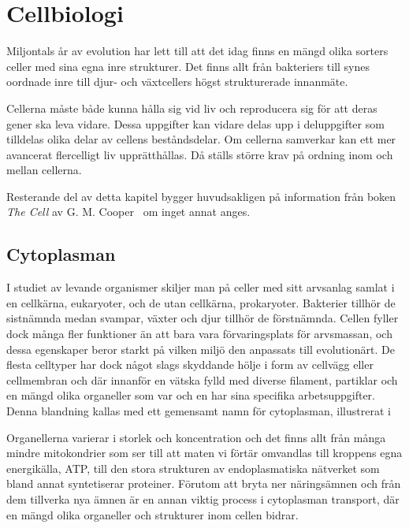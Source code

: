 \chapter{Cellbiologi}

Miljontals år av evolution har lett till att det idag finns en mängd olika sorters celler med sina egna inre strukturer. Det finns allt från bakteriers till synes oordnade inre till djur- och växtcellers högst strukturerade innanmäte. 

Cellerna måste både kunna hålla sig vid liv och reproducera sig för att deras gener ska leva vidare. Dessa uppgifter kan vidare delas upp i deluppgifter som tilldelas olika delar av cellens beståndsdelar. Om cellerna samverkar kan ett mer avancerat flercelligt liv upprätthållas. Då ställs större krav på ordning inom och mellan cellerna.

Resterande del av detta kapitel bygger huvudsakligen på information från boken \emph{The Cell} av G. M.  Cooper~\cite{Cooper_TheCell2000} om inget annat anges.


\section{Cytoplasman}
I studiet av levande organismer skiljer man på celler med sitt arvsanlag samlat i en cellkärna, eukaryoter, och de utan cellkärna, prokaryoter. Bakterier tillhör de sistnämnda medan svampar, växter och djur tillhör de förstnämnda. Cellen fyller dock många fler funktioner än att bara vara förvaringsplats för arvsmassan, och dessa egenskaper beror starkt på vilken miljö den anpassats till evolutionärt. De flesta celltyper har dock något slags skyddande hölje i form av cellvägg eller cellmembran och där innanför en vätska fylld med diverse filament, partiklar och en mängd olika organeller som var och en har sina specifika arbetsuppgifter. Denna blandning kallas med ett gemensamt namn för cytoplasman, illustrerat i 

Organellerna varierar i storlek och koncentration och det finns allt från många mindre mitokondrier som ser till att maten vi förtär omvandlas till kroppens egna energikälla, ATP, till den stora strukturen av endoplasmatiska nätverket som bland annat syntetiserar proteiner. Förutom att bryta ner näringsämnen och från dem tillverka nya ämnen är en annan viktig process i cytoplasman transport, där en mängd olika organeller och strukturer inom cellen bidrar.


